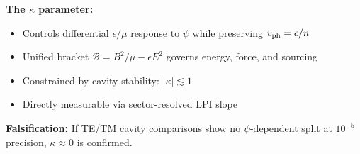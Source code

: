 \begin{tcolorbox}[colback=blue!5!white, colframe=blue!50!black, title=Dual-Sector Extension Summary]
\textbf{The $\kappa$ parameter:}
\begin{itemize}[nosep]
\item Controls differential $\epsilon/\mu$ response to $\psi$ while preserving $v_{\rm ph} = c/n$
\item Unified bracket $\mathcal{B} = B^2/\mu - \epsilon E^2$ governs energy, force, and sourcing
\item Constrained by cavity stability: $|\kappa| \lesssim 1$
\item Directly measurable via sector-resolved LPI slope
\end{itemize}
\textbf{Falsification:} If TE/TM cavity comparisons show no $\psi$-dependent split at $10^{-5}$ precision, $\kappa \approx 0$ is confirmed.
\end{tcolorbox}
